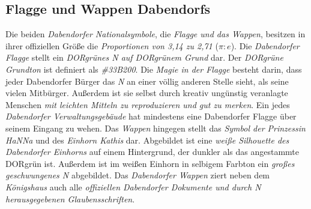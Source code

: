 \subsection{{Flagge und Wappen Dabendorfs}}
\vspace*{-3mm}
\begin{figure}[!ht]
\centering
\begin{floatrow}
\end{floatrow}
\end{figure}
\vspace*{-2mm}
\noindent Die beiden \textit{Dabendorfer Nationalsymbole}, die \textit{Flagge und das Wappen}, besitzen in ihrer offiziellen Größe die \textit{Proportionen von 3,14 zu 2,71} ($\pi : e$). Die \textit{Dabendorfer Flagge} stellt ein \textit{DORgrünes N auf DORgrünem Grund} dar. Der \textit{DORgrüne Grundton} ist definiert als \textit{\#33B200}. Die \textit{Magie in der Flagge} besteht darin, dass jeder Dabendorfer Bürger das \textit{N} an einer völlig anderen Stelle sieht, als seine vielen Mitbürger. Außerdem ist sie selbst durch kreativ ungünstig veranlagte Menschen \textit{mit leichten Mitteln zu reproduzieren und gut zu merken}. Ein jedes \textit{Dabendorfer Verwaltungsgebäude} hat mindestens eine Dabendorfer Flagge über seinem Eingang zu wehen. Das \textit{Wappen} hingegen stellt das \textit{Symbol der Prinzessin HaNNa} und des \textit{Einhorn Kathis} dar. Abgebildet ist eine \textit{weiße Silhouette des Dabendorfer Einhorns} auf einem Hintergrund, der dunkler als das angestammte DORgrün ist. Außerdem ist im weißen Einhorn in selbigem Farbton ein \textit{großes geschwungenes N} abgebildet. Das \textit{Dabendorfer Wappen} ziert neben dem \textit{Königshaus} auch alle \textit{offiziellen Dabendorfer Dokumente und durch N herausgegebenen Glaubensschriften}.

